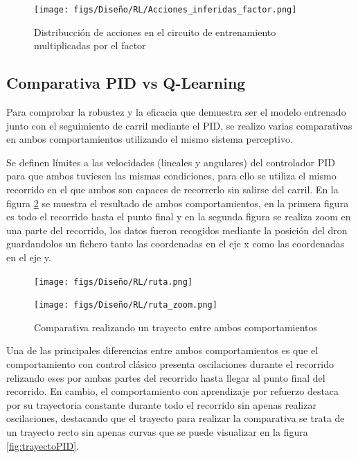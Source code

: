 \begin{figure} [H]
  \begin{center}
    \texttt{[image: figs/Diseño/RL/Acciones\_inferidas\_factor.png]}
  \end{center}
  \caption{Distribucción de acciones en el circuito de entrenamiento multiplicadas por el factor}
  \label{fig:inferencia_factor}
\end{figure}

\subsection{Comparativa PID vs Q-Learning}
\label{sec:Análisis y comparativa entre el seguiento de carril clásico}
Para comprobar la robustez y la eficacia que demuestra ser el modelo entrenado junto con el seguimiento de carril mediante el PID, se realizo varias comparativas en ambos
comportamientos utilizando el mismo sistema perceptivo. 

Se definen límites a las velocidades (lineales y angulares) del controlador PID para que ambos tuviesen las mismas condiciones, para ello se utiliza el mismo recorrido en el que ambos son capaces 
de recorrerlo sin salirse del carril. 
En la figura \ref{fig:comparativa} se muestra el resultado de ambos comportamientos, en la primera figura es todo el recorrido hasta el punto
final y en la segunda figura se realiza zoom en una parte del recorrido, los datos fueron recogidos mediante la posición del dron guardandolos un fichero tanto las coordenadas 
en el eje x como las coordenadas en el eje y. 
  
\begin{figure}[H]
  \centering
  \begin{minipage}{1.0\textwidth}
    \texttt{[image: figs/Diseño/RL/ruta.png]}
  \end{minipage}
  \hfill
  \begin{minipage}{1.0\textwidth}
    \texttt{[image: figs/Diseño/RL/ruta\_zoom.png]}
  \end{minipage}
  \caption{Comparativa realizando un trayecto entre ambos comportamientos}
  \label{fig:comparativa}
\end{figure}

Una de las principales diferencias entre ambos comportamientos es que el comportamiento con control clásico presenta oscilaciones durante el recorrido relizando eses 
por ambas partes del recorrido hasta llegar al punto final del recorrido. En cambio, el comportamiento con aprendizaje por refuerzo destaca por su trayectoria constante 
durante todo el recorrido sin apenas realizar oscilaciones, destacando que el trayecto para realizar la comparativa se trata de un trayecto recto sin apenas curvas que se 
puede visualizar en la figura \ref{fig:trayectoPID}.


